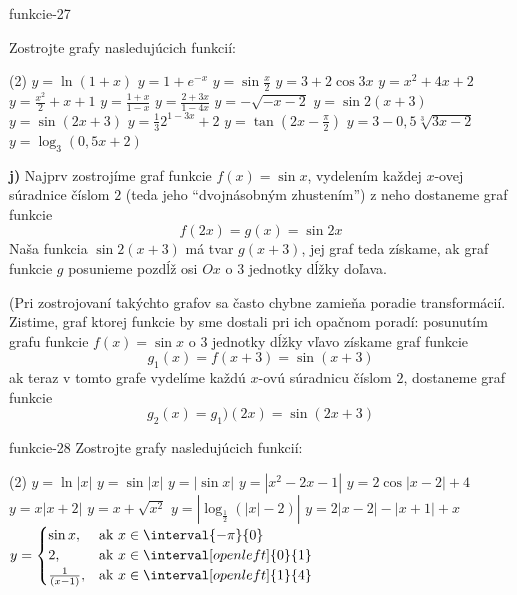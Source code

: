 \begin{defproblem}{funkcie-27}
\begin{samepage}
Zostrojte grafy nasledujúcich funkcií:
\begin{tasks}(2)
  \task $y=\ln (1+x)$
  \task $y=1+e^{-x}$
  \task $y=\sin \frac{x}{2}$
  \task $y=3+2\cos 3x$
  \task $y=x^2+4x+2$
  \task $y=\frac{x^2}{2}+x+1$
  \task $y=\frac{1+x}{1-x}$
  \task $y=\frac{2+3x}{1-4x}$
  \task $y=-\sqrt{-x-2}$
  \task $y=\sin 2(x+3)$
  \task $y=\sin (2x+3)$
  \task $y=\frac{1}{3}2^{1-3x}+2$
  \task $y=\tan (2x-\frac{\pi}{2})$
  \task $y=3-0,5\sqrt[3]{3x-2}$
  \task $y=\log_3 (0,5x+2)$
\end{tasks}
\end{samepage}

\begin{solution}
  \textbf{j)}
  Najprv zostrojíme graf funkcie $f(x)=\sin x$, vydelením každej $x$-ovej
  súradnice číslom $2$ (teda jeho \enquote{dvojnásobným zhustením}) z neho
  dostaneme graf funkcie
  \[
    f(2x)=g(x)=\sin 2x
  \]
  Naša funkcia $\sin 2(x+3)$ má tvar $g(x+3)$, jej graf teda získame, ak graf
  funkcie $g$ posunieme pozdĺž osi $Ox$ o $3$ jednotky dĺžky doľava.

  (Pri zostrojovaní takýchto grafov sa často chybne zamieňa poradie
  transformácií. Zistime, graf ktorej funkcie by sme dostali pri ich opačnom
  poradí: posunutím grafu funkcie $f(x) = \sin{x}$ o $3$ jednotky dĺžky vľavo
  získame graf funkcie
  \[
    g_1(x) = f(x + 3) = \sin{(x+3)}
  \]
  ak teraz v tomto grafe vydelíme každú $x$-ovú súradnicu číslom $2$, dostaneme
  graf funkcie
  \[
    g_2(x) = g_1)(2x) = \sin{(2x+3)}
  \]
\end{solution}
\end{defproblem}

\begin{defproblem}{funkcie-28}
Zostrojte grafy nasledujúcich funkcií:
\begin{tasks}(2)
  \task $y=\ln |x|$
  \task $y=\sin |x|$
  \task $y=|\sin x|$
  \task $y=|x^2-2x-1|$
  \task $y=2\cos |x-2|+4$
  \task $y=x|x+2|$
  \task $y=x+\sqrt{x^2}$
  \task $y=|\log_{\frac{1}{2}}(|x|-2)|$
  \task $y=2|x-2|-|x+1|+x$
  \task $y=
    \begin{cases}
      \sin x,          & \text{ak } x \in \interval{-\pi}{0} \\
      2,               & \text{ak } x \in \interval[open left]{0}{1} \\
      \frac{1}{(x-1)}, & \text{ak } x \in \interval[open left]{1}{4}
    \end{cases}
  $
\end{tasks}
\end{defproblem}

